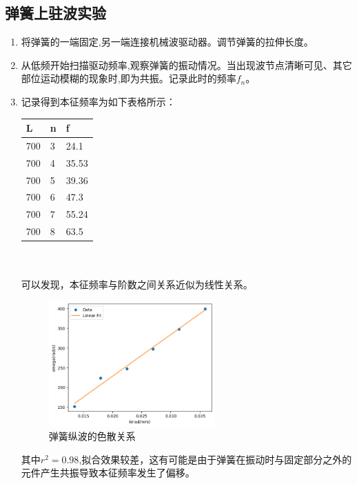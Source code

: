 \documentclass[UTF8]{ctexart}
\begin{document}
\subsection{弹簧上驻波实验}
\begin{enumerate}
\item 将弹簧的一端固定,另一端连接机械波驱动器。调节弹簧的拉伸长度。
\item 从低频开始扫描驱动频率,观察弹簧的振动情况。当出现波节点清晰可见、其它部位运动模糊的现象时,即为共振。记录此时的频率$f_n$。
\item 记录得到本征频率为如下表格所示：
\\
\begin{table}[htbp]
    \centering
\begin{tabular}{l|l|l}
L&n&f\\
\hline
700&3&24.1\\
700&4&35.53\\
700&5&39.36\\
700&6&47.3\\
700&7&55.24\\
700&8&63.5\\
\end{tabular}
\end{table}
\\
\\可以发现，本征频率与阶数之间关系近似为线性关系。
\begin{figure}[htbp]
    \centering
    \includegraphics[width=0.6\textwidth]{output.png}
    \caption{弹簧纵波的色散关系}
    \label{fig:disp}
\end{figure}
其中$r^2 = 0.98$,拟合效果较差，这有可能是由于弹簧在振动时与固定部分之外的元件产生共振导致本征频率发生了偏移。
\end{enumerate}
\end{document}
